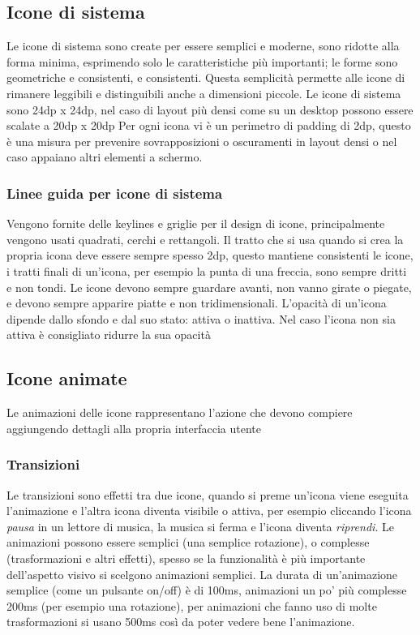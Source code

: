 \documentclass[12pt, a4paper]{report}
\begin{document}
		\subsection{Icone di sistema}
			Le icone di sistema sono create per essere semplici e moderne, sono ridotte alla forma minima, esprimendo solo le caratteristiche più importanti;
			le forme sono geometriche e consistenti, e consistenti. Questa semplicità permette alle icone di rimanere leggibili e distinguibili anche a dimensioni piccole.
			Le icone di sistema sono 24dp x 24dp, nel caso di layout più densi come su un desktop possono essere scalate a 20dp x 20dp
			Per ogni icona vi è un perimetro di padding di 2dp, questo è una misura per prevenire sovrapposizioni o oscuramenti in layout densi o nel caso appaiano altri elementi a schermo.

			\subsubsection{Linee guida per icone di sistema}
			Vengono fornite delle keylines e griglie per il design di icone, principalmente vengono usati quadrati, cerchi e rettangoli.
			Il tratto che si usa quando si crea la propria icona deve essere sempre spesso 2dp, questo mantiene consistenti le icone, i tratti finali di un'icona, per esempio la punta di una freccia, sono sempre dritti e non tondi.
			Le icone devono sempre guardare avanti, non vanno girate o piegate, e devono sempre apparire piatte e non tridimensionali.
			L'opacità di un'icona dipende dallo sfondo e dal suo stato: attiva o inattiva. Nel caso l'icona non sia attiva è consigliato ridurre la sua opacità
		\subsection{Icone animate}
			Le animazioni delle icone rappresentano l'azione che devono compiere aggiungendo dettagli alla propria interfaccia utente
			\subsubsection{Transizioni}
				Le transizioni sono effetti tra due icone, quando si preme un'icona viene eseguita l'animazione e l'altra icona diventa visibile o attiva, per esempio cliccando l'icona \textit{pausa} in un lettore di musica, la musica si ferma e l'icona diventa \textit{riprendi}.
				Le animazioni possono essere semplici (una semplice rotazione), o complesse (trasformazioni e altri effetti), spesso se la funzionalità è più importante dell'aspetto visivo si scelgono animazioni semplici.
				La durata di un'animazione semplice (come un pulsante on/off) è di 100ms, animazioni un po' più complesse 200ms (per esempio una rotazione), per animazioni che fanno uso di molte trasformazioni si usano 500ms così da poter vedere bene l'animazione.
\end{document}
